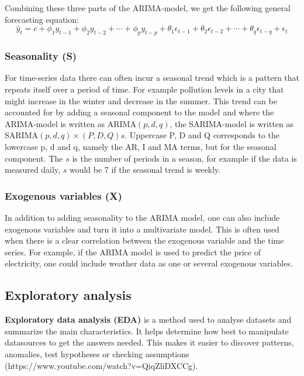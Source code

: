 Combining these three parts of the ARIMA-model, we get the following general forecasting equation:
\begin{equation}
\hat{y}_t = c + \phi_1y_{t-1} + \phi_2y_{t-2} + \cdots + \phi_py_{t-p} + \theta_1\epsilon_{t-1} + \theta_2\epsilon_{t-2} + \cdots + \theta_q\epsilon_{t-q} + \epsilon_t
\end{equation}

\subsubsection{Seasonality (S)}\label{SeasonalityTheory}
For time-series data there can often incur a seasonal trend which is a pattern that repeats itself over a period of time. For example pollution levels in a city that might increase in the winter and decrease in the summer. This trend can be accounted for by adding a seasonal component to the model and where the ARIMA-model is written as ARIMA$(p,d,q)$, the SARIMA-model is written as SARIMA$(p,d,q) \times (P,D,Q)s$. Uppercase P, D and Q corresponds to the lowercase p, d and q, namely the AR, I and MA terms, but for the seasonal component. The $s$ is the number of periods in a season, for example if the data is measured daily, $s$ would be 7 if the seasonal trend is weekly.~\parencite{chang_et_al_2012}

\subsubsection{Exogenous variables (X)}\label{ExogenousTheory}
In addition to adding seasonality to the ARIMA model, one can also include exogenous variables and turn it into a multivariate model. This is often used when there is a clear correlation between the exogenous variable and the time series. For example, if the ARIMA model is used to predict the price of electricity, one could include weather data as one or several exogenous variables.~\parencite{elamin_fukushige_2018}


\subsection{Exploratory analysis}
\textbf{Exploratory data analysis (EDA)} is a method used to analyse datasets and summarize the main characteristics. It helps determine how best to manipulate datasources to get the answers needed. This makes it easier to discover patterns, anomalies, test hypotheses or checking assumptions (https://www.youtube.com/watch?v=QiqZliDXCCg). 


